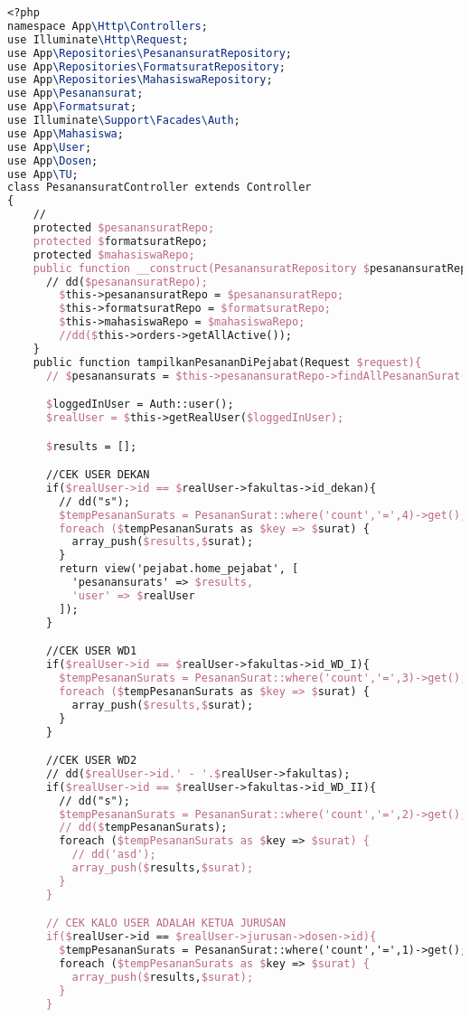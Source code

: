 \begin{lstlisting}[language=tex,basicstyle=\tiny,caption=PesanansuratController.php]
<?php
namespace App\Http\Controllers;
use Illuminate\Http\Request;
use App\Repositories\PesanansuratRepository;
use App\Repositories\FormatsuratRepository;
use App\Repositories\MahasiswaRepository;
use App\Pesanansurat;
use App\Formatsurat;
use Illuminate\Support\Facades\Auth;
use App\Mahasiswa;
use App\User;
use App\Dosen;
use App\TU;
class PesanansuratController extends Controller
{
    //
    protected $pesanansuratRepo;
    protected $formatsuratRepo;
    protected $mahasiswaRepo;
    public function __construct(PesanansuratRepository $pesanansuratRepo, FormatsuratRepository $formatsuratRepo, MahasiswaRepository $mahasiswaRepo){
      // dd($pesanansuratRepo);
        $this->pesanansuratRepo = $pesanansuratRepo;
        $this->formatsuratRepo = $formatsuratRepo;
        $this->mahasiswaRepo = $mahasiswaRepo;
        //dd($this->orders->getAllActive());
    }
    public function tampilkanPesananDiPejabat(Request $request){
      // $pesanansurats = $this->pesanansuratRepo->findAllPesananSurat();

      $loggedInUser = Auth::user();
      $realUser = $this->getRealUser($loggedInUser);

      $results = [];

      //CEK USER DEKAN
      if($realUser->id == $realUser->fakultas->id_dekan){
        // dd("s");
        $tempPesananSurats = PesananSurat::where('count','=',4)->get();
        foreach ($tempPesananSurats as $key => $surat) {
          array_push($results,$surat);
        }
        return view('pejabat.home_pejabat', [
          'pesanansurats' => $results,
          'user' => $realUser
        ]);
      }

      //CEK USER WD1
      if($realUser->id == $realUser->fakultas->id_WD_I){
        $tempPesananSurats = PesananSurat::where('count','=',3)->get();
        foreach ($tempPesananSurats as $key => $surat) {
          array_push($results,$surat);
        }
      }

      //CEK USER WD2
      // dd($realUser->id.' - '.$realUser->fakultas);
      if($realUser->id == $realUser->fakultas->id_WD_II){
        // dd("s");
        $tempPesananSurats = PesananSurat::where('count','=',2)->get();
        // dd($tempPesananSurats);
        foreach ($tempPesananSurats as $key => $surat) {
          // dd('asd');
          array_push($results,$surat);
        }
      }

      // CEK KALO USER ADALAH KETUA JURUSAN
      if($realUser->id == $realUser->jurusan->dosen->id){
        $tempPesananSurats = PesananSurat::where('count','=',1)->get();
        foreach ($tempPesananSurats as $key => $surat) {
          array_push($results,$surat);
        }
      }


\end{lstlisting}
